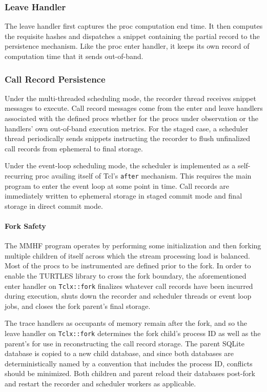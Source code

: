 \documentclass{article}[letter,10pt]
\begin{document}
{{    \subsubsection{Leave Handler}{
      The leave handler first captures the proc computation end time. It then computes the requisite hashes and
      dispatches a snippet containing the partial record to the persistence mechanism. Like the proc enter handler,
      it keeps its own record of computation time that it sends out-of-band.
    }
    \subsubsection{Call Record Persistence}{
      Under the multi-threaded scheduling mode, the recorder thread receives snippet messages to execute.
      Call record messages come from the enter and leave handlers associated with the defined procs
      whether for the procs under observation or the handlers' own out-of-band execution metrics.
      For the staged case, a scheduler thread periodically sends snippets instructing the recorder to
      flush unfinalized call records from ephemeral to final storage.

      Under the event-loop scheduling mode, the scheduler is implemented as a self-recurring proc
      availing itself of Tcl's \texttt{after} mechanism. This requires the main program to enter the
      event loop at some point in time. Call records are immediately written to ephemeral storage
      in staged commit mode and final storage in direct commit mode.

      \paragraph{Fork Safety}{
        The MMHF program operates by performing some initialization and then forking multiple children of itself
        across which the stream processing load is balanced. Most of the procs to be instrumented are defined
        prior to the fork. In order to enable the TURTLES library to cross the fork boundary, the aforementioned
        enter handler on \texttt{Tclx::fork} finalizes whatever call records have been incurred during execution,
        shuts down the recorder and scheduler threads or event loop jobs, and closes the fork parent's final storage.

        The trace handlers as occupants of memory remain after the fork, and so the leave handler on \texttt{Tclx::fork}
        determines the fork child's process ID as well as the parent's for use in reconstructing the call record storage.
        The parent SQLite database is copied to a new child database, and since both databases are deterministically
        named by a convention that includes the process ID, conflicts should be minimized. Both children and parent
        reload their databases post-fork and restart the recorder and scheduler workers as applicable.

}}}}
\end{document}
